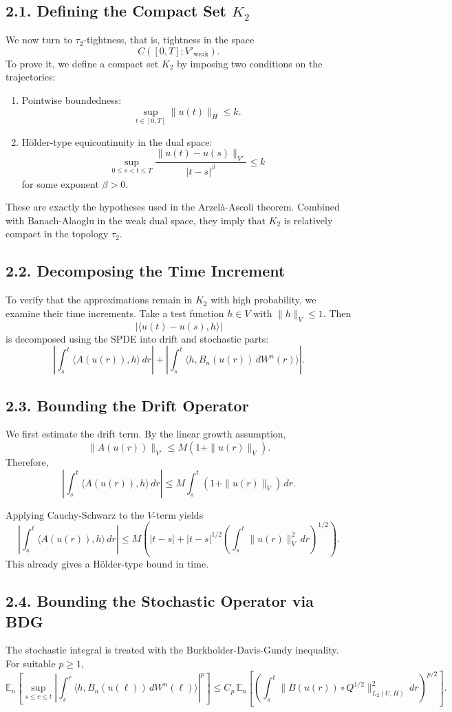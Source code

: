\documentclass[11pt]{article}
\theoremstyle{definition}
\theoremstyle{remark}
\begin{document}
\subsection*{2.1. Defining the Compact Set \(K_2\)}
We now turn to \(\tau_2\)-tightness, that is, tightness in the space
\[
C([0,T];V'_{\mathrm{weak}}).
\]
To prove it, we define a compact set \(K_2\) by imposing two conditions on the trajectories:
\begin{enumerate}
\item Pointwise boundedness:
\[
\sup_{t\in[0,T]}\|u(t)\|_H\le k.
\]

\item Hölder-type equicontinuity in the dual space:
\[
\sup_{0\le s<t\le T}
\frac{\|u(t)-u(s)\|_{V'}}{|t-s|^\beta}
\le k
\]
for some exponent \(\beta>0\).
\end{enumerate}

These are exactly the hypotheses used in the Arzelà-Ascoli theorem. Combined with Banach-Alaoglu in the weak dual space, they imply that \(K_2\) is relatively compact in the topology \(\tau_2\).

\subsection*{2.2. Decomposing the Time Increment}
To verify that the approximations remain in \(K_2\) with high probability, we examine their time increments. Take a test function \(h\in V\) with \(\|h\|_V\le 1\). Then
\[
|\langle u(t)-u(s),h\rangle|
\]
is decomposed using the SPDE into drift and stochastic parts:
\[
\left|
\int_s^t \langle A(u(r)),h\rangle\,dr
\right|
+
\left|
\int_s^t \langle h,B_n(u(r))\,dW^n(r)\rangle
\right|.
\]

\subsection*{2.3. Bounding the Drift Operator}
We first estimate the drift term. By the linear growth assumption,
\[
\|A(u(r))\|_{V'}\le M(1+\|u(r)\|_V).
\]
Therefore,
\[
\left|
\int_s^t \langle A(u(r)),h\rangle\,dr
\right|
\le
M\int_s^t (1+\|u(r)\|_V)\,dr.
\]

Applying Cauchy-Schwarz to the \(V\)-term yields
\[
\left|
\int_s^t \langle A(u(r)),h\rangle\,dr
\right|
\le
M\left(
|t-s|+|t-s|^{1/2}
\left(\int_s^t \|u(r)\|_V^2\,dr\right)^{1/2}
\right).
\]
This already gives a Hölder-type bound in time.

\subsection*{2.4. Bounding the Stochastic Operator via BDG}
The stochastic integral is treated with the Burkholder-Davis-Gundy inequality. For suitable \(p\ge 1\),
\[
\mathbb E_n\left[
\sup_{s\le r\le t}
\left|
\int_s^r \langle h,B_n(u(\ell))\,dW^n(\ell)\rangle
\right|^p
\right]
\le
C_p\,
\mathbb E_n\left[
\left(
\int_s^t \|B(u(r))\circ Q^{1/2}\|_{L_2(U,H)}^2\,dr
\right)^{p/2}
\right].
\]
\end{document}
